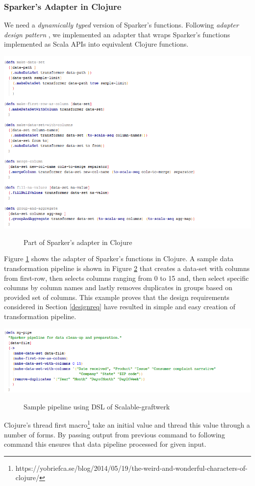 \subsubsection{Sparker's Adapter in Clojure}
We need a \textit{dynamically typed} version of Sparker's functions. Following \textit{adapter design pattern} , we implemented an adapter that wraps Sparker's functions implemented as Scala APIs into equivalent Clojure functions. 
\begin{center}
\includegraphics[width=36em]{./Figures/wrapper}
\begin{figure}[htbp]
\caption{Part of Sparker's adapter in Clojure}
\label{fig:wrapper}
\end{figure}
\end{center}
Figure \ref{fig:wrapper} shows the adapter of Sparker's functions in Clojure. A sample data transformation pipeline is shown in Figure \ref{fig:sample-pipeline} that creates a data-set with columns from first-row, then selects columns ranging from 0 to 15 and, then select specific columns by column names and lastly removes duplicates in groups based on provided set of columns. This example proves that the design requirements considered in Section \ref{designreq} have resulted in simple and easy creation of transformation pipeline. 
\begin{center}
\includegraphics[width=36em]{./Figures/sample-pipeline}
\begin{figure}[htbp]
\caption{Sample pipeline using DSL of Scalable-graftwerk}
\label{fig:sample-pipeline}
\end{figure}
\end{center}
Clojure's thread first macro\footnote{https://yobriefca.se/blog/2014/05/19/the-weird-and-wonderful-characters-of-clojure/} take an initial value and thread this value through a number of forms. By passing output from previous command to following command this ensures that data pipeline processed for given input. 
